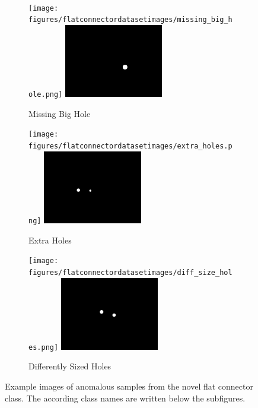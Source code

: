 \begin{figure}[ht]
\begin{subfigure}[b]{0.3\textwidth}
    \end{subfigure}
    \\
    \begin{subfigure}[b]{0.3\textwidth}
        \centering
        \texttt{[image: figures/flatconnectordatasetimages/missing\_big\_hole.png]}
        \includegraphics[width=0.475\textwidth]{figures/flatconnectordatasetimages/missing_big_hole_mask.png}
        \caption{Missing Big Hole}

    \end{subfigure}
    \hfill
    \begin{subfigure}[b]{0.3\textwidth}
        \centering
        \texttt{[image: figures/flatconnectordatasetimages/extra\_holes.png]}
        \includegraphics[width=0.475\textwidth]{figures/flatconnectordatasetimages/extra_holes_mask.png}
        \caption{Extra Holes}

    \end{subfigure}
    \hfill
    \begin{subfigure}[b]{0.3\textwidth}
        \centering
        \texttt{[image: figures/flatconnectordatasetimages/diff\_size\_holes.png]}
        \includegraphics[width=0.475\textwidth]{figures/flatconnectordatasetimages/diff_size_holes_mask.png}
        \caption{Differently Sized Holes}

    \end{subfigure}
    \caption{Example images of anomalous samples from the novel flat connector class. The according class names are written below the subfigures.}
    \label{fig:flatconnectorexampleimages}
\end{figure}


